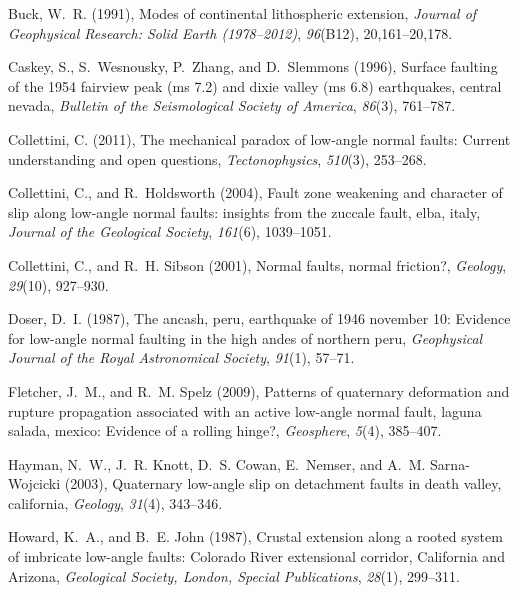 \documentclass[twocolumn,grl]{AGUTeX}
\begin{document}
\begin{article}
\begin{thebibliography}{25}
Buck, W.~R. (1991), Modes of continental lithospheric extension,
  \textit{Journal of Geophysical Research: Solid Earth (1978--2012)},
  \textit{96}(B12), 20,161--20,178.

Caskey, S., S.~Wesnousky, P.~Zhang, and D.~Slemmons (1996), Surface faulting of
  the 1954 fairview peak (ms 7.2) and dixie valley (ms 6.8) earthquakes,
  central nevada, \textit{Bulletin of the Seismological Society of America},
  \textit{86}(3), 761--787.

Collettini, C. (2011), The mechanical paradox of low-angle normal faults:
  Current understanding and open questions, \textit{Tectonophysics},
  \textit{510}(3), 253--268.

Collettini, C., and R.~Holdsworth (2004), Fault zone weakening and character of
  slip along low-angle normal faults: insights from the zuccale fault, elba,
  italy, \textit{Journal of the Geological Society}, \textit{161}(6),
  1039--1051.

Collettini, C., and R.~H. Sibson (2001), Normal faults, normal friction?,
  \textit{Geology}, \textit{29}(10), 927--930.

Doser, D.~I. (1987), The ancash, peru, earthquake of 1946 november 10: Evidence
  for low-angle normal faulting in the high andes of northern peru,
  \textit{Geophysical Journal of the Royal Astronomical Society},
  \textit{91}(1), 57--71.

Fletcher, J.~M., and R.~M. Spelz (2009), Patterns of quaternary deformation and
  rupture propagation associated with an active low-angle normal fault, laguna
  salada, mexico: Evidence of a rolling hinge?, \textit{Geosphere},
  \textit{5}(4), 385--407.

Hayman, N.~W., J.~R. Knott, D.~S. Cowan, E.~Nemser, and A.~M. Sarna-Wojcicki
  (2003), Quaternary low-angle slip on detachment faults in death valley,
  california, \textit{Geology}, \textit{31}(4), 343--346.

Howard, K.~A., and B.~E. John (1987), Crustal extension along a rooted system
  of imbricate low-angle faults: {Colorado River} extensional corridor,
  {California} and {Arizona}, \textit{Geological Society, London, Special
  Publications}, \textit{28}(1), 299--311.


\end{thebibliography}
\end{article}
\end{document}
